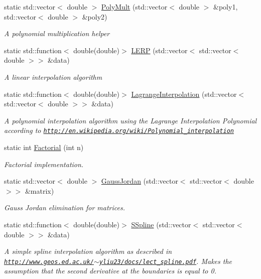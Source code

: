 \begin{DoxyCompactItemize}
static std\+::vector$<$ double $>$ \hyperlink{classfnn_1_1_math_adad1b0610a61cf1f547902c63ac8f5f7}{Poly\+Mult} (std\+::vector$<$ double $>$ \&poly1, std\+::vector$<$ double $>$ \&poly2)
\begin{DoxyCompactList}\small\item\em A polynomial multiplication helper \end{DoxyCompactList}\item 
static std\+::function$<$ double(double)$>$ \hyperlink{classfnn_1_1_math_a14cd337326da37fa8e6943f868e5eace}{L\+E\+R\+P} (std\+::vector$<$ std\+::vector$<$ double $>$$>$ \&data)
\begin{DoxyCompactList}\small\item\em A linear interpolation algorithm \end{DoxyCompactList}\item 
static std\+::function$<$ double(double)$>$ \hyperlink{classfnn_1_1_math_a7f538718ad625d83a574b338a32d143e}{Lagrange\+Interpolation} (std\+::vector$<$ std\+::vector$<$ double $>$$>$ \&data)
\begin{DoxyCompactList}\small\item\em A polynomial interpolation algorithm using the Lagrange Interpolation Polynomial according to \href{http://en.wikipedia.org/wiki/Polynomial_interpolation}{\tt http\+://en.\+wikipedia.\+org/wiki/\+Polynomial\+\_\+interpolation} \end{DoxyCompactList}\item 
static int \hyperlink{classfnn_1_1_math_ad4998cc7ea2c63175d926eafedefd8c2}{Factorial} (int n)
\begin{DoxyCompactList}\small\item\em Factorial implementation. \end{DoxyCompactList}\item 
static std\+::vector$<$ double $>$ \hyperlink{classfnn_1_1_math_ac1d0f387a23294e585489c34dfccd2e4}{Gauss\+Jordan} (std\+::vector$<$ std\+::vector$<$ double $>$$>$ \&matrix)
\begin{DoxyCompactList}\small\item\em Gauss Jordan elimination for matrices. \end{DoxyCompactList}\item 
static std\+::function$<$ double(double)$>$ \hyperlink{classfnn_1_1_math_a6ae76ac184b97909719434da6081cc9c}{S\+Spline} (std\+::vector$<$ std\+::vector$<$ double $>$$>$ \&data)
\begin{DoxyCompactList}\small\item\em A simple spline interpolation algorithm as described in \href{http://www.geos.ed.ac.uk/~yliu23/docs/lect_spline.pdf}{\tt http\+://www.\+geos.\+ed.\+ac.\+uk/$\sim$yliu23/docs/lect\+\_\+spline.\+pdf}. Makes the assumption that the second derivative at the boundaries is equal to 0. \end{DoxyCompactList}\item 

\end{DoxyCompactItemize}

